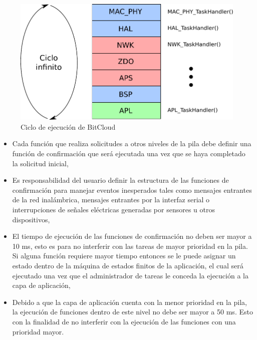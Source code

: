 \begin{figure}
	\centering
	\includegraphics[scale=0.6]{capitulo_2_imgs/task_handler.pdf}
	\caption{Ciclo de ejecución de BitCloud}
	\label{fig:task_handler}
\end{figure}

\begin{itemize}
	\item Cada función que realiza solicitudes a otros niveles de la pila debe definir una función de confirmación que será ejecutada una vez que se haya completado la solicitud inicial, 
	\item Es responsabilidad del usuario definir la estructura de las funciones de confirmación para manejar eventos inesperados tales como mensajes entrantes de la red inalámbrica, mensajes entrantes por la interfaz serial o interrupciones de señales eléctricas generadas por sensores u otros dispositivos,  
	\item El tiempo de ejecución de las funciones de confirmación no deben ser mayor a 10 ms, esto es para no interferir con las tareas de mayor prioridad en la pila. Si alguna función requiere mayor tiempo entonces se le puede asignar un estado dentro de la máquina de estados finitos de la aplicación, el cual será ejecutado una vez que el administrador de tareas le conceda la ejecución a la capa de aplicación, 
	\item Debido a que la capa de aplicación cuenta con la menor prioridad en la pila, la ejecución de funciones dentro de este nivel no debe ser mayor a 50 ms. Esto con la finalidad de no interferir con la ejecución de las funciones con una prioridad mayor. 
\end{itemize}


